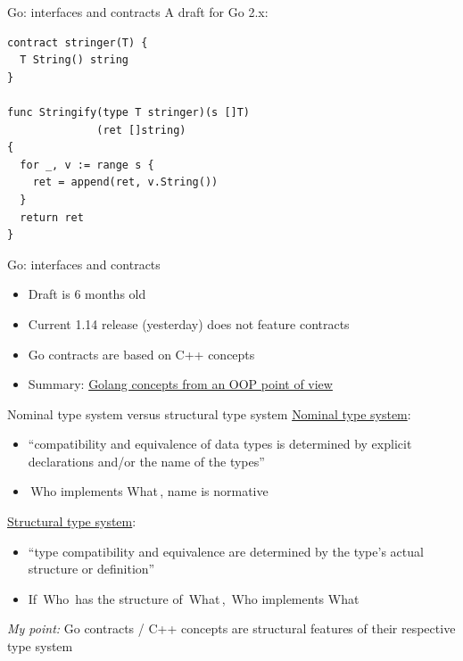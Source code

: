 \documentclass{beamer}
\newcommand\code[1]{\,{\color[HTML]{884400}#1}\,}
\begin{document}
\begin{frame}[fragile]{Go: interfaces and contracts}
  A draft for Go 2.x:

  \begin{verbatim}
contract stringer(T) {
  T String() string
}

func Stringify(type T stringer)(s []T)
              (ret []string)
{
  for _, v := range s {
    ret = append(ret, v.String())
  }
  return ret
}
  \end{verbatim}
\end{frame}

\begin{frame}[fragile]{Go: interfaces and contracts}
  \begin{itemize}
    \item Draft is 6 months old
    \item Current 1.14 release (yesterday) does not feature contracts
    \item Go contracts are based on C++ concepts
    \item Summary: \href{https://github.com/luciotato/golang-notes/blob/master/OOP.md}{Golang concepts from an OOP point of view}
  \end{itemize}
\end{frame}

\begin{frame}[fragile]{Nominal type system versus structural type system}
  \href{https://en.wikipedia.org/wiki/Nominal_type_system}{Nominal type system}:
  \begin{itemize}
    \item \enquote{compatibility and equivalence of data types is determined by explicit declarations and/or the name of the types}
    \item \code{Who implements What}, name is normative
  \end{itemize}

  \href{https://en.wikipedia.org/wiki/Structural_type_system}{Structural type system}:
  \begin{itemize}
    \item \enquote{type compatibility and equivalence are determined by the type's actual structure or definition}
    \item If \code{Who} has the structure of \code{What}, \code{Who implements What}
  \end{itemize}

  \emph{My point:} Go contracts / C++ concepts are structural features of their respective type system
\end{frame}
\end{document}
